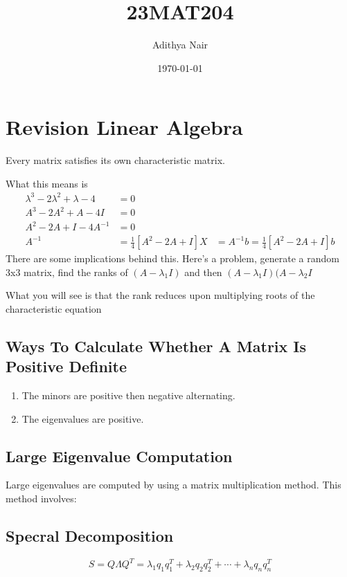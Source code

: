 \documentclass[11pt]{article}
\author{Adithya Nair}
\date{\today}
\title{23MAT204}
\begin{document}
\maketitle
\tableofcontents

\section{Revision Linear Algebra}
\label{sec:org5630eb5}

Every matrix satisfies its own characteristic matrix.

What this means is \[\begin{aligned}
		\lambda^3 - 2\lambda^2 + \lambda -4 & = 0                                    \\
		A^3 - 2A^2 + A -4I                  & = 0                                    \\
		A^2 - 2A + I - 4A^{-1}              & = 0                                    \\
		A^{-1}                              & = \frac{1}{4}[A^2 - 2A + I]
		X                                   & = A^{-1}b = \frac{1}{4}[A^2 - 2A + I]b
	\end{aligned}\] There are some implications behind this. Here's a
problem, generate a random 3x3 matrix, find the ranks of
\((A- \lambda_1 I)\) and then \((A-\lambda_1 I)(A-\lambda_2 I\)

What you will see is that the rank reduces upon multiplying roots of the
characteristic equation
\subsection{Ways To Calculate Whether A Matrix Is Positive Definite}
\label{ways-to-calculate-whether-a-matrix-is-positive-definite}
\begin{enumerate}
	\item The minors are positive then negative alternating.

	\item The eigenvalues are positive.
\end{enumerate}
\subsection{Large Eigenvalue Computation}
\label{large-eigenvalue-computation}
Large eigenvalues are computed by using a matrix multiplication method.
This method involves:
\subsection{Specral Decomposition}
\label{specral-decomposition}
\[S = Q \Lambda Q^T = \lambda_1 q_1 q_1^T + \lambda_2 q_2 q_2^T + \cdots + \lambda_n q_n q_n^T\]
\end{document}
